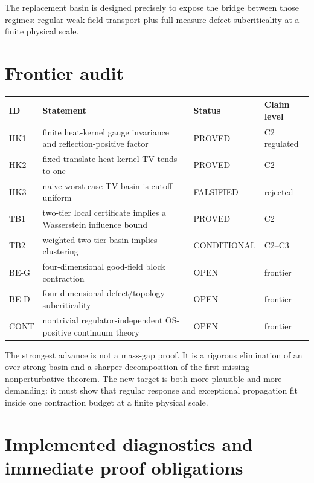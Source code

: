 \documentclass[11pt]{article}
\newcommand{\Pstatus}{\textcolor{proved}{\textsf{PROVED}}}
\newcommand{\Cstatus}{\textcolor{conditional}{\textsf{CONDITIONAL}}}
\newcommand{\Ostatus}{\textcolor{open}{\textsf{OPEN}}}
\newcommand{\Fstatus}{\textcolor{open}{\textsf{FALSIFIED}}}
\theoremstyle{remark}
\begin{document}
The replacement basin is designed precisely to expose the bridge between
those regimes: regular weak-field transport plus full-measure defect
subcriticality at a finite physical scale.

\section{Frontier audit}

\begin{longtable}{p{}p{}p{}p{}}
\toprule
ID & Statement & Status & Claim level\\
\midrule
\endhead
HK1 & finite heat-kernel gauge invariance and reflection-positive factor & \Pstatus & C2 regulated\\
HK2 & fixed-translate heat-kernel TV tends to one & \Pstatus & C2\\
HK3 & naive worst-case TV basin is cutoff-uniform & \Fstatus & rejected\\
TB1 & two-tier local certificate implies a Wasserstein influence bound & \Pstatus & C2\\
TB2 & weighted two-tier basin implies clustering & \Cstatus & C2--C3\\
BE-G & four-dimensional good-field block contraction & \Ostatus & frontier\\
BE-D & four-dimensional defect/topology subcriticality & \Ostatus & frontier\\
CONT & nontrivial regulator-independent OS-positive continuum theory & \Ostatus & frontier\\
\bottomrule
\end{longtable}

The strongest advance is not a mass-gap proof.  It is a rigorous elimination
of an over-strong basin and a sharper decomposition of the first missing
nonperturbative theorem.  The new target is both more plausible and more
demanding: it must show that regular response and exceptional propagation fit
inside one contraction budget at a finite physical scale.

\section{Implemented diagnostics and immediate proof obligations}
\end{document}
